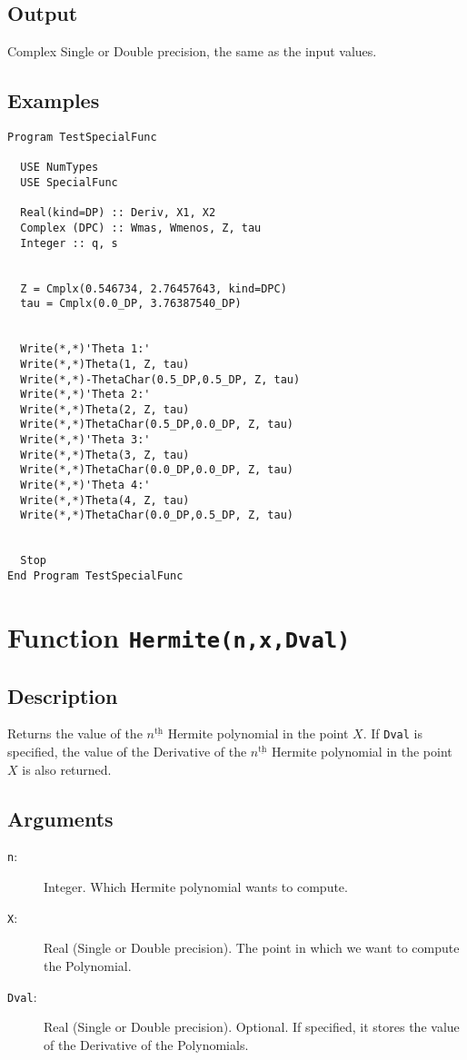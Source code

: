 \subsection{Output}

Complex Single or Double precision, the same as the input values.

\subsection{Examples}

\begin{verbatim}
Program TestSpecialFunc

  USE NumTypes
  USE SpecialFunc

  Real(kind=DP) :: Deriv, X1, X2
  Complex (DPC) :: Wmas, Wmenos, Z, tau
  Integer :: q, s


  Z = Cmplx(0.546734, 2.76457643, kind=DPC)
  tau = Cmplx(0.0_DP, 3.76387540_DP)


  Write(*,*)'Theta 1:'
  Write(*,*)Theta(1, Z, tau)
  Write(*,*)-ThetaChar(0.5_DP,0.5_DP, Z, tau)
  Write(*,*)'Theta 2:'
  Write(*,*)Theta(2, Z, tau)
  Write(*,*)ThetaChar(0.5_DP,0.0_DP, Z, tau)
  Write(*,*)'Theta 3:'
  Write(*,*)Theta(3, Z, tau)
  Write(*,*)ThetaChar(0.0_DP,0.0_DP, Z, tau)
  Write(*,*)'Theta 4:'
  Write(*,*)Theta(4, Z, tau)
  Write(*,*)ThetaChar(0.0_DP,0.5_DP, Z, tau)
  

  Stop
End Program TestSpecialFunc
\end{verbatim}

\section{Function \texttt{Hermite(n,x,Dval)}}

\subsection{Description}

Returns the value of the $n^{\underline{\text{th}}}$ Hermite
polynomial in the point $X$. If \texttt{Dval} is specified, the value
of the Derivative of the $n^{\underline{\text{th}}}$ Hermite
polynomial in the point $X$ is also returned.

\subsection{Arguments}

\begin{description}
\item[\texttt{n}:] Integer. Which Hermite polynomial wants to compute.
\item[\texttt{X}:] Real (Single or Double precision). The point in
  which we want to compute the Polynomial.
\item[\texttt{Dval}:] Real (Single or Double precision). Optional. If
  specified, it stores the value of the Derivative of the
  Polynomials.
\end{description}

